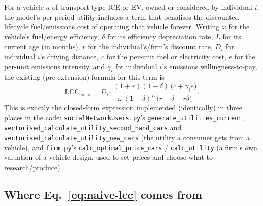 \documentclass[11pt]{article}
\newcommand{\code}[1]{\texttt{#1}}
\begin{document}
For a vehicle $a$ of transport type ICE or EV, owned or considered by
individual $i$, the model's per-period utility includes a term that
penalises the discounted lifecycle fuel/emissions cost of operating that
vehicle forever. Writing $\omega$ for the vehicle's fuel/energy efficiency,
$\delta$ for its efficiency depreciation rate, $L$ for its current age (in
months), $r$ for the individual's/firm's discount rate, $D_i$ for individual
$i$'s driving distance, $c$ for the per-unit fuel or electricity cost, $e$
for the per-unit emissions intensity, and $\gamma_i$ for individual $i$'s
emissions willingness-to-pay, the existing (pre-extension) formula for this
term is
\begin{equation}
  \mathrm{LCC}_{\mathrm{extra}}
  = D_i \cdot
    \frac{(1+r)(1-\delta)\,\bigl(c + \gamma_i e\bigr)}
         {\omega\,(1-\delta)^{L}\,\bigl(r - \delta - r\delta\bigr)} .
  \label{eq:naive-lcc}
\end{equation}
This is exactly the closed-form expression implemented (identically) in
three places in the code: \code{socialNetworkUsers.py}'s
\code{generate\_utilities\_current}, \code{vectorised\_calculate\_utility\_second\_hand\_cars}
and \code{vectorised\_calculate\_utility\_new\_cars} (the utility a consumer
gets from a vehicle), and \code{firm.py}'s \code{calc\_optimal\_price\_cars} /
\code{calc\_utility} (a firm's own valuation of a vehicle design, used to set
prices and choose what to research/produce).

\subsection{Where Eq.~\eqref{eq:naive-lcc} comes from}
\label{sec:derivation}
\end{document}
